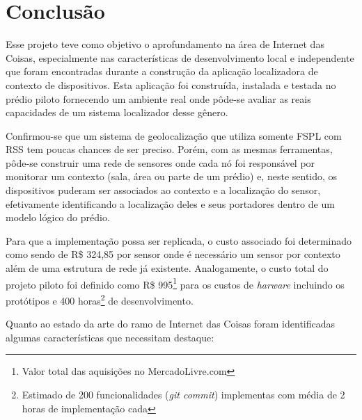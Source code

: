 \chapter{Conclusão}
\label{chap:Conclusao}


Esse projeto teve como objetivo o aprofundamento na área de Internet das Coisas,
especialmente nas características de desenvolvimento local e independente que
foram encontradas durante a construção da aplicação localizadora de contexto de
dispositivos. Esta aplicação foi construída, instalada e testada no prédio
piloto fornecendo um ambiente real onde pôde-se avaliar as reais capacidades de
um sistema localizador desse gênero.

Confirmou-se que um sistema de
geolocalização que utiliza somente FSPL com RSS tem poucas chances de ser
preciso. Porém, com as mesmas ferramentas, pôde-se construir uma rede de sensores
onde cada nó foi responsável por monitorar um contexto (sala, área ou parte de um
prédio) e, neste sentido, os dispositivos puderam ser associados ao contexto e a
localização do sensor, efetivamente identificando a localização deles
e seus portadores dentro de um modelo lógico do prédio.

Para que a implementação possa ser replicada, o custo associado foi determinado
como sendo de R\$ 324,85 por sensor onde é necessário um sensor por contexto além
de uma estrutura de rede já existente. Analogamente, o custo total do projeto
piloto foi definido como R\$ 995\footnote{Valor total das aquisições no
MercadoLivre.com} para os custos de \emph{harware} incluindo os protótipos e 400
horas\footnote{Estimado de 200 funcionalidades (\emph{git commit}) implementas
com média de 2 horas de implementação cada} de desenvolvimento.

Quanto ao estado da arte do ramo de Internet das Coisas foram identificadas
algumas características que necessitam destaque:


